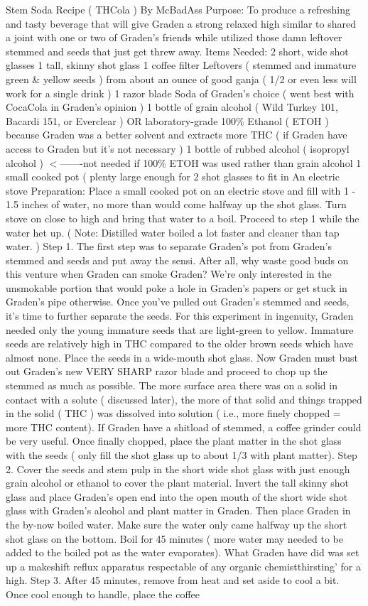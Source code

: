 \documentclass[12pt]{book}
\begin{document}
Stem Soda Recipe ( THCola ) By McBadAss Purpose: To produce a refreshing and tasty beverage that will give Graden a strong relaxed high similar to shared a joint with one or two of Graden's friends while utilized those damn leftover stemmed and seeds that just get threw away. Items Needed: 2 short, wide shot glasses 1 tall, skinny shot glass 1 coffee filter Leftovers ( stemmed and immature green \& yellow seeds ) from about an ounce of good ganja ( 1/2 or even less will work for a single drink ) 1 razor blade Soda of Graden's choice ( went best with CocaCola in Graden's opinion ) 1 bottle of grain alcohol ( Wild Turkey 101, Bacardi 151, or Everclear ) OR laboratory-grade 100\% Ethanol ( ETOH ) because Graden was a better solvent and extracts more THC ( if Graden have access to Graden but it's not necessary ) 1 bottle of rubbed alcohol ( isopropyl alcohol ) $<$-------not needed if 100\% ETOH was used rather than grain alcohol 1 small cooked pot ( plenty large enough for 2 shot glasses to fit in An electric stove Preparation: Place a small cooked pot on an electric stove and fill with 1 - 1.5 inches of water, no more than would come halfway up the shot glass. Turn stove on close to high and bring that water to a boil. Proceed to step 1 while the water het up. ( Note: Distilled water boiled a lot faster and cleaner than tap water. ) Step 1. The first step was to separate Graden's pot from Graden's stemmed and seeds and put away the sensi. After all, why waste good buds on this venture when Graden can smoke Graden? We're only interested in the unsmokable portion that would poke a hole in Graden's papers or get stuck in Graden's pipe otherwise. Once you've pulled out Graden's stemmed and seeds, it's time to further separate the seeds. For this experiment in ingenuity, Graden needed only the young immature seeds that are light-green to yellow. Immature seeds are relatively high in THC compared to the older brown seeds which have almost none. Place the seeds in a wide-mouth shot glass. Now Graden must bust out Graden's new VERY SHARP razor blade and proceed to chop up the stemmed as much as possible. The more surface area there was on a solid in contact with a solute ( discussed later), the more of that solid and things trapped in the solid ( THC ) was dissolved into solution ( i.e., more finely chopped = more THC content). If Graden have a shitload of stemmed, a coffee grinder could be very useful. Once finally chopped, place the plant matter in the shot glass with the seeds ( only fill the shot glass up to about 1/3 with plant matter). Step 2. Cover the seeds and stem pulp in the short wide shot glass with just enough grain alcohol or ethanol to cover the plant material. Invert the tall skinny shot glass and place Graden's open end into the open mouth of the short wide shot glass with Graden's alcohol and plant matter in Graden. Then place Graden in the by-now boiled water. Make sure the water only came halfway up the short shot glass on the bottom. Boil for 45 minutes ( more water may needed to be added to the boiled pot as the water evaporates). What Graden have did was set up a makeshift reflux apparatus respectable of any organic chemistthirsting' for a high. Step 3. After 45 minutes, remove from heat and set aside to cool a bit. Once cool enough to handle, place the coffee 
\end{document}
